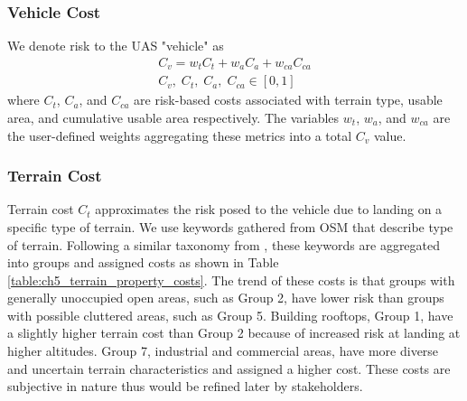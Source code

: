 \subsubsection{Vehicle Cost}\label{sec:ch5_vehicle_cost}

We denote risk to the \ac{UAS} "vehicle" as
\begin{align}
    C_v = w_t C_t + w_{a}C_{a} + w_{ca} C_{ca}\\
    C_v,\; C_t,\; C_a,\; C_{ca} \in [0,1]
\end{align}
where $C_t$, $C_a$, and $C_{ca}$ are risk-based costs associated with terrain type, usable area, and cumulative usable area respectively.  The variables $w_t$, $w_a$, and $w_{ca}$ are the user-defined weights aggregating these metrics into a total $C_v$ value.

\subsubsection{Terrain Cost}

Terrain cost $C_t$ approximates the risk posed to the vehicle due to landing on a specific type of terrain. We use keywords gathered from \ac{OSM} that describe type of terrain. Following a similar taxonomy from \cite{di_donato_evaluating_2017}, these  keywords are aggregated into groups and assigned costs as shown in Table \ref{table:ch5_terrain_property_costs}.  The trend of these costs is that groups with generally unoccupied open areas, such as Group 2, have lower risk than groups with possible cluttered areas, such as Group 5. Building rooftops, Group 1, have a slightly higher terrain cost than Group 2 because of increased risk at landing at higher altitudes. Group 7, industrial and commercial areas, have more diverse and uncertain terrain characteristics and assigned a higher cost. These costs are subjective in nature thus would be refined later by stakeholders.

